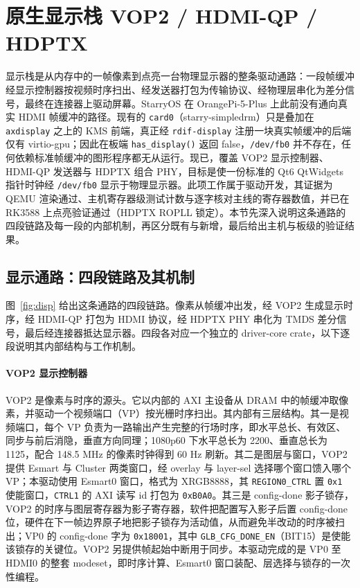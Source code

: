 \section{原生显示栈 VOP2 / HDMI-QP / HDPTX}

显示栈是从内存中的一帧像素到点亮一台物理显示器的整条驱动通路：一段帧缓冲经显示控制器按视频时序扫出、经发送器打包为传输协议、经物理层串化为差分信号，最终在连接器上驱动屏幕。StarryOS 在 OrangePi-5-Plus 上此前没有通向真实 HDMI 帧缓冲的路径。现有的 \texttt{card0}（starry-simpledrm）只是叠加在 \texttt{axdisplay} 之上的 KMS 前端，真正经 \texttt{rdif-display} 注册一块真实帧缓冲的后端仅有 virtio-gpu；因此在板端 \texttt{has\_display()} 返回 false，\texttt{/dev/fb0} 并不存在，任何依赖标准帧缓冲的图形程序都无从运行。现已，覆盖 VOP2 显示控制器、HDMI-QP 发送器与 HDPTX 组合 PHY，目标是使一份标准的 Qt6 QtWidgets 指针时钟经 \texttt{/dev/fb0} 显示于物理显示器。此项工作属于驱动开发，其证据为 QEMU 渲染通过、主机寄存器级测试计数与逐字核对主线的寄存器数值，并已在 RK3588 上点亮验证通过（HDPTX ROPLL 锁定）。本节先深入说明这条通路的四段链路及每一段的内部机制，再区分既有与新增，最后给出主机与板级的验证结果。


\subsection{显示通路：四段链路及其机制}

图~\ref{fig:disp} 给出这条通路的四段链路。像素从帧缓冲出发，经 VOP2 生成显示时序，经 HDMI-QP 打包为 HDMI 协议，经 HDPTX PHY 串化为 TMDS 差分信号，最后经连接器抵达显示器。四段各对应一个独立的 driver-core crate，以下逐段说明其内部结构与工作机制。

\paragraph{VOP2 显示控制器}
VOP2 是像素与时序的源头。它以内部的 AXI 主设备从 DRAM 中的帧缓冲取像素，并驱动一个视频端口（VP）按光栅时序扫出。其内部有三层结构。其一是视频端口，每个 VP 负责为一路输出产生完整的行场时序，即水平总长、有效区、同步与前后消隐，垂直方向同理；1080p60 下水平总长为 2200、垂直总长为 1125，配合 148.5 MHz 的像素时钟得到 60 Hz 刷新。其二是图层与窗口，VOP2 提供 Esmart 与 Cluster 两类窗口，经 overlay 与 layer-sel 选择哪个窗口馈入哪个 VP；本驱动使用 Esmart0 窗口，格式为 XRGB8888，其 \texttt{REGION0\_CTRL} 置 \texttt{0x1} 使能窗口，\texttt{CTRL1} 的 AXI 读写 id 打包为 \texttt{0xB0A0}。其三是 config-done 影子锁存，VOP2 的时序与图层寄存器为影子寄存器，软件把配置写入影子后置 config-done 位，硬件在下一帧边界原子地把影子锁存为活动值，从而避免半改动的时序被扫出；VP0 的 config-done 字为 \texttt{0x18001}，其中 \texttt{GLB\_CFG\_DONE\_EN}（BIT15）是使能该锁存的关键位。VOP2 另提供帧起始中断用于同步。本驱动完成的是 VP0 至 HDMI0 的整套 modeset，即时序计算、Esmart0 窗口装配、层选择与锁存的一次性编程。

